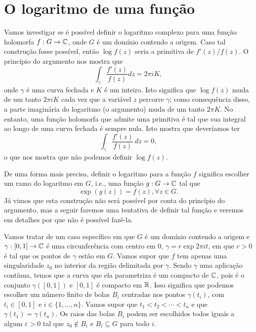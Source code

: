 \section{O logaritmo de uma função}

Vamos investigar se é possível definir o logaritmo complexo para uma função holomorfa 
$f: G \to \mathbb{C}$, onde $G$ é um domínio contendo a origem. Caso tal construção fosse possível,
então $\log f(z)$ seria a primitiva de $f'(z)/f(z)$. O princípio do argumento nos mostra que
%
\begin{equation*}
    \int_\gamma \frac{f'(z)}{f(z)} dz = 2\pi i K,
\end{equation*}
%
onde $\gamma$ é uma curva fechada e $K$ é um inteiro. Isto significa que $\log f(z)$ muda 
de um tanto $2\pi i K$ cada vez que a variável $z$ percorre $\gamma$; como consequência disso,
a parte imaginária do logaritmo (o argumento) muda de um tanto $2 \pi K$. No entanto, uma
função holomorfa que admite uma primitiva é tal que sua integral ao longo de uma curva fechada
é sempre nula. Isto mostra que deveríamos ter
%
\begin{equation*}
    \int_\gamma \frac{f'(z)}{f(z)} \, dz = 0,
\end{equation*}
o que nos mostra que não podemos definir $\log f(z)$.

De uma forma mais precisa, definir o logaritmo para a função $f$ significa escolher um ramo 
do logaritmo em $G$, i.e., uma função $g: G \to \mathbb{C}$ tal que 
%
\begin{equation*}
    \exp(g(z)) = f(z), \forall z \in G.  
\end{equation*}
%
Já vimos que esta construção não será possível por conta do princípio do argumento, mas a
seguir faremos uma tentativa de definir tal função e veremos em detalhes por que não é 
possível fazê-la.

Vamos tratar de um caso específico em que $G$ é um domínio contendo a origem e 
$\gamma: [0,1] \to \mathbb{C}$ é uma circunferência com centro em $0$, $\gamma = r\exp{2 \pi i t}$, 
em que $r > 0$ é tal que os pontos de $\gamma$ estão em $G$. Vamos supor que $f$ tem apenas 
uma singularidade $z_0$ no interior da região delimitada por $\gamma$. Sendo $\gamma$ uma
aplicação contínua, temos que a curva que ela parametriza é um compacto de $\mathbb{C}$, pois é o
conjunto $\gamma([0,1])$ e $[0,1]$ é compacto em $\mathbb{R}$. Isso significa que podemos escolher um
número finito de bolas $B_i$ centradas nos pontos $\gamma(t_i)$, com $t_i \in [0,1]$ e 
$i \in \{1,\dots, n\}$. Vamos supor que $t_1 < t_2 < \cdots < t_n$ e que 
$\gamma(t_1) = \gamma(t_n)$.  Os raios das bolas $B_i$ podem ser escolhidos todos iguais a
algum $\varepsilon > 0$ tal que $z_0 \not \in B_i$ e $B_i \subseteq G$ para todo $i$.

